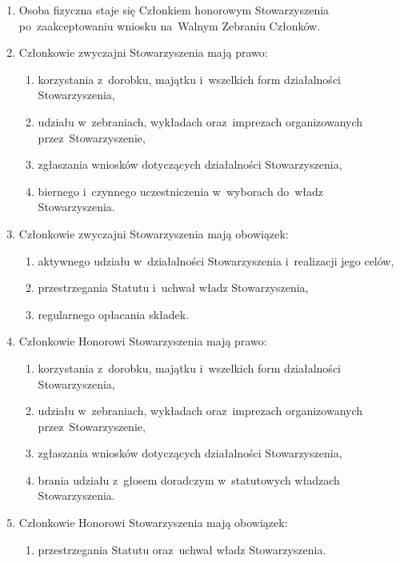 \documentclass{article}
\begin{document}
\begin{enumerate}
\begin{enumerate}
        \item zostanie zgłoszona przez~co najmniej 10 Członków zwyczajnych Stowarzyszenia lub~Zarząd.
      \end{enumerate}
    \item Osoba fizyczna staje się Członkiem honorowym Stowarzyszenia po~zaakceptowaniu wniosku na~Walnym Zebraniu Członków.
    \item Członkowie zwyczajni Stowarzyszenia mają prawo:
      \begin{enumerate}
        \item korzystania z~dorobku, majątku i~wszelkich form działalności Stowarzyszenia,
        \item udziału w~zebraniach, wykładach oraz~imprezach organizowanych przez~Stowarzyszenie,
        \item zgłaszania wniosków dotyczących działalności Stowarzyszenia,
        \item biernego i~czynnego uczestniczenia w~wyborach do~władz Stowarzyszenia.
      \end{enumerate}
    \item Członkowie zwyczajni Stowarzyszenia mają obowiązek:
      \begin{enumerate}
        \item aktywnego udziału w~działalności Stowarzyszenia i~realizacji jego celów,
        \item przestrzegania Statutu i~uchwał władz Stowarzyszenia,
        \item regularnego opłacania składek.
      \end{enumerate}
    \item Członkowie Honorowi Stowarzyszenia mają prawo:
      \begin{enumerate}
        \item korzystania z~dorobku, majątku i~wszelkich form działalności Stowarzyszenia,
        \item udziału w~zebraniach, wykładach oraz~imprezach organizowanych przez~Stowarzyszenie,
        \item zgłaszania wniosków dotyczących działalności Stowarzyszenia,
        \item brania udziału z~głosem doradczym w~statutowych władzach Stowarzyszenia.
      \end{enumerate}
    \item Członkowie Honorowi Stowarzyszenia mają obowiązek:
      \begin{enumerate}
        \item przestrzegania Statutu oraz~uchwał władz Stowarzyszenia.

\end{enumerate}
\end{enumerate}
\end{document}
